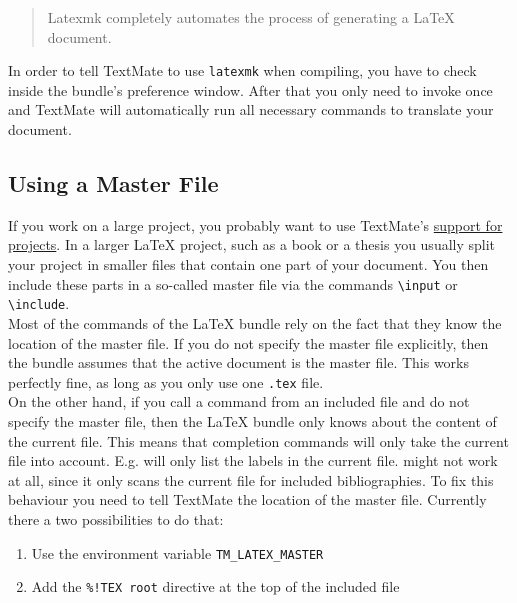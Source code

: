 \documentclass[11pt, x11names]{article}
\begin{document}
\begin{quote}
  Latexmk completely automates the process of generating a LaTeX document.
\end{quote}

\begin{sloppypar}
In order to tell TextMate to use \texttt{latexmk} when compiling, you have to check  inside the bundle's preference window. After that you only need to invoke  once and TextMate will automatically run all necessary commands to translate your document.
\end{sloppypar}

\subsection{Using a Master File}

If you work on a large project, you probably want to use TextMate's \href{http://manual.textmate.org/projects}{support for projects}. In a larger LaTeX project, such as a book or a thesis you usually split your project in smaller files that contain one part of your document. You then include these parts in a so-called master file via the commands \texttt{\textbackslash{}input} or \texttt{\textbackslash{}include}.\\

Most of the commands of the LaTeX bundle rely on the fact that they know the location of the master file. If you do not specify the master file explicitly, then the bundle assumes that the active document is the master file. This works perfectly fine, as long as you only use one \texttt{.tex} file.\\

On the other hand, if you call a command from an included file and do not specify the master file, then the LaTeX bundle only knows about the content of the current file. This means that completion commands will only take the current file into account. E.g.  will only list the labels in the current file.  might not work at all, since it only scans the current file for included bibliographies. To fix this behaviour you need to tell TextMate the location of the master file. Currently there a two possibilities to do that:

\begin{enumerate}
  \item Use the environment variable \texttt{TM\_LATEX\_MASTER}
  \item Add the \texttt{\%!TEX\ root} directive at the top of the included file
\end{enumerate}
\end{document}
